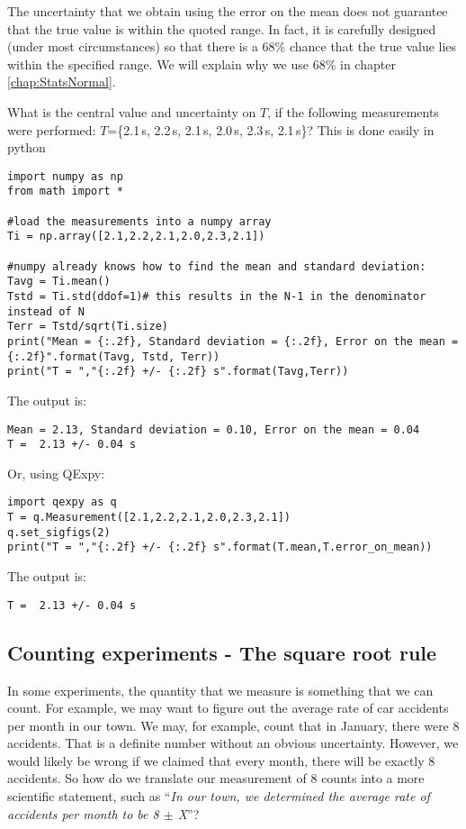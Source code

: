 The uncertainty that we obtain using the error on the mean does not guarantee that the true value is within the quoted range. In fact, it is carefully designed (under most circumstances) so that there is a 68\% chance that the true value lies within the specified range. We will explain why we use 68\% in chapter \ref{chap:StatsNormal}.

\begin{example}{0pt}{What is the central value and uncertainty on $T$, if the following measurements were performed: $T$=\{2.1\,s, 2.2\,s, 2.1\,s, 2.0\,s, 2.3\,s, 2.1\,s\}?}{}
\label{ex:ChapUncertainties_mean}
This is done easily in python
\begin{lstlisting}[frame=single] 
import numpy as np
from math import *

#load the measurements into a numpy array
Ti = np.array([2.1,2.2,2.1,2.0,2.3,2.1])

#numpy already knows how to find the mean and standard deviation:
Tavg = Ti.mean()
Tstd = Ti.std(ddof=1)# this results in the N-1 in the denominator instead of N
Terr = Tstd/sqrt(Ti.size)
print("Mean = {:.2f}, Standard deviation = {:.2f}, Error on the mean = {:.2f}".format(Tavg, Tstd, Terr))
print("T = ","{:.2f} +/- {:.2f} s".format(Tavg,Terr))
\end{lstlisting}
The output is:
\begin{verbatim}
Mean = 2.13, Standard deviation = 0.10, Error on the mean = 0.04
T =  2.13 +/- 0.04 s
\end{verbatim}
Or, using QExpy:
\begin{lstlisting}[frame=single] 
import qexpy as q
T = q.Measurement([2.1,2.2,2.1,2.0,2.3,2.1])
q.set_sigfigs(2)
print("T = ","{:.2f} +/- {:.2f} s".format(T.mean,T.error_on_mean))
\end{lstlisting}
The output is:
\begin{verbatim}
T =  2.13 +/- 0.04 s
\end{verbatim}

\end{example}


\subsection{Counting experiments - The square root rule}
\label{sec:countingError}
In some experiments, the quantity that we measure is something that we can count. For example, we may want to figure out the average rate of car accidents per month in our town. We may, for example, count that in January, there were 8 accidents. That is a definite number without an obvious uncertainty. However, we would likely be wrong if we claimed that every month, there will be exactly 8 accidents. So how do we translate our measurement of 8 counts into a more scientific statement, such as ``\textit{In our town, we determined the average rate of accidents per month to be 8 $\pm$ X}''? 

